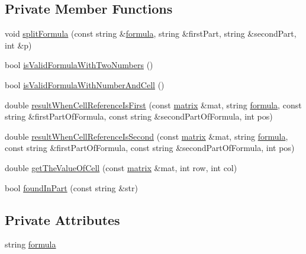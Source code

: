 \subsection*{Private Member Functions}
\begin{DoxyCompactItemize}
\item 
void \hyperlink{class_formula_ae9390fbc99e5ade644589b144c73bfb7}{split\+Formula} (const string \&\hyperlink{class_formula_a2a3b5b998b48db1fadf57752e59ed4fb}{formula}, string \&first\+Part, string \&second\+Part, int \&p)
\item 
bool \hyperlink{class_formula_a0a2b13b0f741ea650e1ae71269dde9a5}{is\+Valid\+Formula\+With\+Two\+Numbers} ()
\item 
bool \hyperlink{class_formula_a83eff8c83a0ea79b3dd21c2e86a546c8}{is\+Valid\+Formula\+With\+Number\+And\+Cell} ()
\item 
double \hyperlink{class_formula_a9a27ccdd3ee3143b1f6e541ec3c6a0ec}{result\+When\+Cell\+Reference\+Is\+First} (const \hyperlink{formula_8h_a869e2a5deeb3daa4c82d6bc91cf20d92}{matrix} \&mat, string \hyperlink{class_formula_a2a3b5b998b48db1fadf57752e59ed4fb}{formula}, const string \&first\+Part\+Of\+Formula, const string \&second\+Part\+Of\+Formula, int pos)
\item 
double \hyperlink{class_formula_ae0edae33b4af295bab04f1f1c06f406f}{result\+When\+Cell\+Reference\+Is\+Second} (const \hyperlink{formula_8h_a869e2a5deeb3daa4c82d6bc91cf20d92}{matrix} \&mat, string \hyperlink{class_formula_a2a3b5b998b48db1fadf57752e59ed4fb}{formula}, const string \&first\+Part\+Of\+Formula, const string \&second\+Part\+Of\+Formula, int pos)
\item 
double \hyperlink{class_formula_a8080ff3cf8fce2d9f1730e772ae21c71}{get\+The\+Value\+Of\+Cell} (const \hyperlink{formula_8h_a869e2a5deeb3daa4c82d6bc91cf20d92}{matrix} \&mat, int row, int col)
\item 
bool \hyperlink{class_formula_a79079cea46f8320cd7a63f576251baac}{found\+In\+Part} (const string \&str)
\end{DoxyCompactItemize}
\subsection*{Private Attributes}
\begin{DoxyCompactItemize}
\item 
string \hyperlink{class_formula_a2a3b5b998b48db1fadf57752e59ed4fb}{formula}
\end{DoxyCompactItemize}


